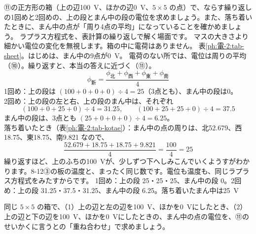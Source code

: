 \label{ph:電-2:ex11}
\begin{phreidai}[表計算で箱の中の電位を求める]
⑪の正方形の箱（上の辺\qty{100}{V}、ほかの辺\qty{0}{V}、$5\times5$ の点）で、ならす繰り返しの1回めと2回めの、上の段とまん中の段の電位を求めましょう。また、落ち着いたときに、まん中の点が「周り4点の平均」になっていることを確かめましょう。
\phbamen
ラプラス方程式を、表計算の繰り返しで解く場面です。
\phmushi
マスの大きさより細かい電位の変化を無視します。箱の中に電荷はありません。
\phzu
表\ref{ph:電-2:tab-sheet}。はじめは、まん中の9点が\qty{0}{V}。
\phriyu
電荷のない所では、電位は周りの平均（⑩）。繰り返すと、本当の答えに近づく（⑪）。
\phtateru
\[\phi_{\text{新}}=\frac{\phi_{\text{北}}+\phi_{\text{西}}+\phi_{\text{東}}+\phi_{\text{南}}}{4}\]
\phtoku
1回め：上の段は $(100+0+0+0)\div4=25$（3点とも）、まん中の段は0。\\
2回め：上の段の左と右、上の段のまん中は、それぞれ
\[(100+0+25+0)\div4=31.25,\qquad(100+25+25+0)\div4=37.5\]
まん中の段は、3点とも $(25+0+0+0)\div4=6.25$。\\
落ち着いたとき（表\ref{ph:電-2:tab-kotae}）：まん中の点の周りは、北52.679、西18.75、東18.75、南9.821 なので、
\[\frac{52.679+18.75+18.75+9.821}{4}=\frac{100}{4}=25\]
\phtashikame
繰り返すほど、上のふちの\qty{100}{V}が、少しずつ下へしみこんでいくようすがわかります。8-12③の板の温度と、まったく同じ数です。電位も温度も、同じラプラス方程式をみたすからです。
\kotae 1回め：上の段 25・25・25、まん中の段 0。2回め：上の段 31.25・37.5・31.25、まん中の段 6.25。落ち着いたまん中は\qty{25}{V}
\end{phreidai}
\begin{jibun}
同じ $5\times5$ の箱で、（1）上の辺と左の辺を\qty{100}{V}、ほかを\qty{0}{V}にしたとき、（2）上の辺と下の辺を\qty{100}{V}、ほかを\qty{0}{V}にしたときの、まん中の点の電位を、⑪のせいかくに言うとの「重ね合わせ」で求めましょう。
\end{jibun}

